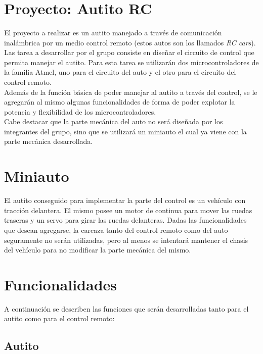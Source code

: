 \documentclass[a4paper,10pt]{article}
\title{  }
\begin{document}
	\maketitle %
	\newpage

	\tableofcontents %
	\newpage

	\section{Proyecto: Autito RC}
		El proyecto a realizar es un autito manejado a través de comunicación inalámbrica por un medio control remoto (estos autos son los llamados \emph{RC cars}).
		Las tarea a desarrollar por el grupo consiste en diseñar el circuito de control que permita manejar el autito. Para esta tarea se utilizarán dos
		microcontroladores de la familia Atmel, uno para el circuito del auto y el otro para el circuito del control remoto. \\
		\indent Además de la función básica de poder manejar al autito a través del control, se le agregarán al mismo algunas funcionalidades de forma de 
		poder explotar la potencia y flexibilidad de los microcontroladores. \\
		\indent Cabe destacar que la parte mecánica del auto no será diseñada por los integrantes del grupo, sino que se utilizará un miniauto el cual ya viene 
		con la parte mecánica desarrollada.

	\section{Miniauto}
		El autito conseguido para implementar la parte del control es un vehículo con tracción delantera. El mismo posee un motor de continua para mover las
		ruedas traseras y un servo para girar las ruedas delanteras. Dadas las funcionalidades que desean agregarse, la carcaza tanto del
		control remoto como del auto seguramente no serán  utilizadas, pero al menos se intentará mantener el chasis del vehículo para no modificar la
		parte mecánica del mismo.	

	\section{Funcionalidades}
		A continuación se describen las funciones que serán desarrolladas tanto para el autito como para el control remoto:
		\subsection{Autito}
\end{document}
